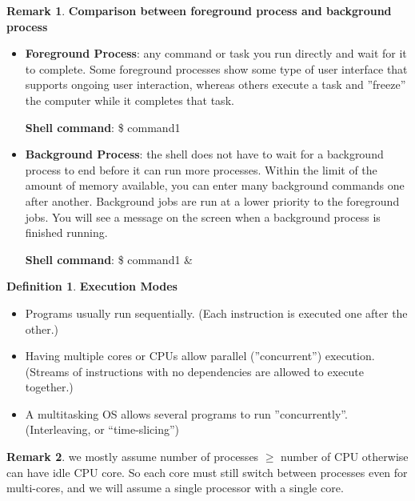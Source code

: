 \documentclass[12pt,a4paper]{article}
\theoremstyle{definition}
\newtheorem*{remark}{Remark}
\newtheorem{definition}{Definition}[section]
\newenvironment{myitemize}
{ \begin{itemize}
    \setlength{\itemsep}{5pt}
    \setlength{\parskip}{0pt}
    \setlength{\parsep}{0pt}     }
{ \end{itemize}                  }
\begin{document}
\begin{remark}{\textbf{Comparison between foreground process and background process}}
	\begin{myitemize}
		\item \textbf{Foreground Process}: any command or task you run directly and wait for it to complete. Some foreground processes show some type of user interface that supports ongoing user interaction, whereas others execute a task and ''freeze'' the computer while it completes that task.
		
		\textbf{Shell command}: \textsf{\$ command1}
		\item \textbf{Background Process}: the shell does not have to wait for a background process to end before it can run more processes. Within the limit of the amount of memory available, you can enter many background commands one after another. Background jobs are run at a lower priority to the foreground jobs. You will see a message on the screen when a background process is finished running.
		
		\textbf{Shell command}: \textsf{\$ command1 \&}
	\end{myitemize}
\end{remark}

\begin{definition}{\textbf{Execution Modes}}
	\begin{myitemize}
		\item Programs usually run sequentially. (Each instruction is executed one after the other.)
		\item Having multiple cores or CPUs allow parallel (''concurrent'') execution. (Streams of instructions with no dependencies are allowed to execute together.)
		\item A multitasking OS allows several programs to run ''concurrently''. (Interleaving, or “time-slicing”)
	\end{myitemize}
\end{definition}

\begin{remark}
	we mostly assume number of processes $\geq$ number of CPU otherwise can have idle CPU core. So each core must still switch between processes even for multi-cores, and we will assume a single processor with a single core.
\end{remark}
\end{document}
